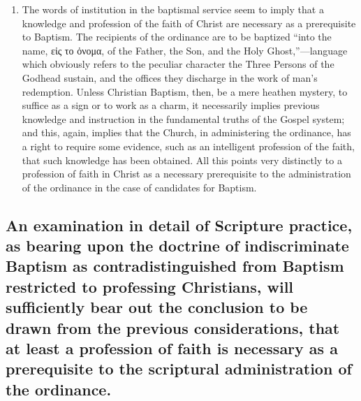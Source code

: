 \documentclass[]{book}
\begin{document}
\begin{enumerate}
\item
  The words of institution in the baptismal service seem to imply that a knowledge and profession of the faith of Christ are necessary as a prerequisite to Baptism. The recipients of the ordinance are to be baptized ``into the name, εἰς το ὀνομα, of the Father, the Son, and the Holy Ghost,''---language which obviously refers to the peculiar character the Three Persons of the Godhead sustain, and the offices they discharge in the work of man's redemption. Unless Christian Baptism, then, be a mere heathen mystery, to suffice as a sign or to work as a charm, it necessarily implies previous knowledge and instruction in the fundamental truths of the Gospel system; and this, again, implies that the Church, in administering the ordinance, has a right to require some evidence, such as an intelligent profession of the faith, that such knowledge has been obtained. All this points very distinctly to a profession of faith in Christ as a necessary prerequisite to the administration of the ordinance in the case of candidates for Baptism.
\end{enumerate}

\hypertarget{an-examination-in-detail-of-scripture-practice-as-bearing-upon-the-doctrine-of-indiscriminate-baptism-as-contradistinguished-from-baptism-restricted-to-professing-christians-will-sufficiently-bear-out-the-conclusion-to-be-drawn-from-the-previous-considerations-that-at-least-a-profession-of-faith-is-necessary-as-a-prerequisite-to-the-scriptural-administration-of-the-ordinance.}{%
\subsection{An examination in detail of Scripture practice, as bearing upon the doctrine of indiscriminate Baptism as contradistinguished from Baptism restricted to professing Christians, will sufficiently bear out the conclusion to be drawn from the previous considerations, that at least a profession of faith is necessary as a prerequisite to the scriptural administration of the ordinance.}\label{an-examination-in-detail-of-scripture-practice-as-bearing-upon-the-doctrine-of-indiscriminate-baptism-as-contradistinguished-from-baptism-restricted-to-professing-christians-will-sufficiently-bear-out-the-conclusion-to-be-drawn-from-the-previous-considerations-that-at-least-a-profession-of-faith-is-necessary-as-a-prerequisite-to-the-scriptural-administration-of-the-ordinance.}}
\end{document}
